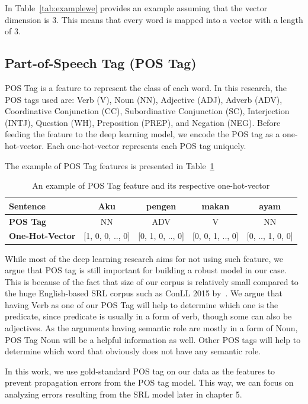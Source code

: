 In Table~\ref{tab:examplewe} provides an example assuming that the vector dimension is 3. This means that every word is mapped into a vector with a length of 3.

\subsection{Part-of-Speech Tag (POS Tag)}
POS Tag is a feature to represent the class of each word. In this research, the POS tags used are: Verb (V), Noun (NN), Adjective (ADJ), Adverb (ADV), Coordinative Conjunction (CC), Subordinative Conjunction (SC), Interjection (INTJ), Question (WH), Preposition (PREP), and Negation (NEG). Before feeding the feature to the deep learning model, we encode the POS tag as a one-hot-vector. Each one-hot-vector represents each POS tag uniquely.

The example of POS Tag features is presented in Table~\ref{tab:examplepos}
\begin{table}
	\centering
	\caption{An example of POS Tag feature and its respective one-hot-vector}
	\label{tab:examplepos}
	\begin{tabular}{|lcccc|}
		\hline
		\textbf{Sentence} 				& Aku & pengen & makan & ayam \\
		\hline
		\textbf{POS Tag}				& NN & ADV & V & NN  \\
		\hline
		\textbf{One-Hot-Vector}		& [1, 0, 0, .., 0] & [0, 1, 0, .., 0] & [0, 0, 1, .., 0] & [0, .., 1, 0, 0] \\
		\hline
	\end{tabular}
\end{table}

While most of the deep learning research aims for not using such feature, we argue that POS tag is still important for building a robust model in our case. This is because of the fact that size of our corpus is relatively small compared to the huge English-based SRL corpus such as ConLL 2015 by~\cite{carreras2005introduction}. We argue that having Verb as one of our POS Tag will help to determine which one is the predicate, since predicate is usually in a form of verb, though some can also be adjectives. As the arguments having semantic role are mostly in a form of Noun, POS Tag Noun will be a helpful information as well. Other POS tags will help to determine which word that obviously does not have any semantic role.

In this work, we use gold-standard POS tag on our data as the features to prevent propagation errors from the POS tag model. This way, we can focus on analyzing errors resulting from the SRL model later in chapter 5. 

